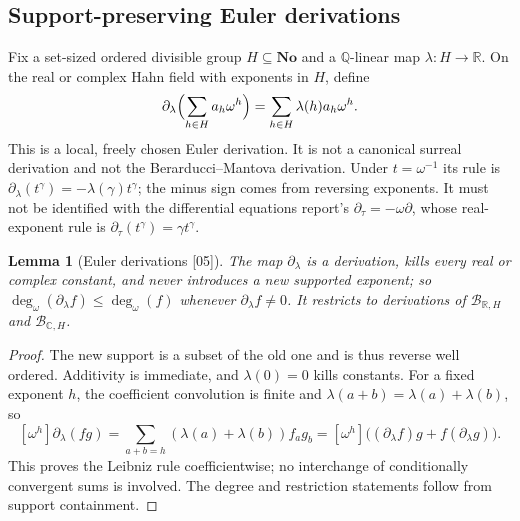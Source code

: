 \documentclass[11pt,oneside]{article}
\numberwithin{equation}{section}
\newtheorem{lemma}[lemma]{Lemma}
\theoremstyle{definition}
\theoremstyle{remark}
\newcommand{\No}{\mathbf{No}}
\newcommand{\Q}{\mathbb Q}
\newcommand{\R}{\mathbb R}
\newcommand{\C}{\mathbb C}
\newcommand{\ddeg}{\operatorname{deg}_{\omega}}
\newcommand{\src}[1]{\textup{\textsf{\small[#1]}}}
\newcommand{\replabel}[1]{\nolinkurl{#1}}
\begin{document}
\subsection{Support-preserving Euler derivations}

Fix a set-sized ordered divisible group $H\subseteq\No$ and a $\Q$-linear
map $\lambda:H\to\R$. On the real or complex Hahn field with exponents in
$H$, define
\begin{equation}\label{odg:eq:euler}
 \partial_\lambda\Bigl(\sum_{h\in H}a_h\omega^h\Bigr)
   =\sum_{h\in H}\lambda(h)a_h\omega^h.
\end{equation}
This is a local, freely chosen Euler derivation. It is not a canonical
surreal derivation and not the Berarducci--Mantova derivation. Under
$t=\omega^{-1}$ its rule is
$\partial_\lambda(t^\gamma)=-\lambda(\gamma)t^\gamma$; the minus sign comes
from reversing exponents. It must not be identified with the differential
equations report's $\partial_\tau=-\omega\partial$, whose real-exponent rule
is $\partial_\tau(t^\gamma)=\gamma t^\gamma$.

\begin{lemma}[Euler derivations \src{05}]\label{odg:lem:derivation}
The map $\partial_\lambda$ is a derivation, kills every real or complex
constant, and never introduces a new supported exponent; so
$\ddeg(\partial_\lambda f)\le\ddeg(f)$ whenever $\partial_\lambda f\ne0$.
It restricts to derivations of $\mathcal B_{\R,H}$ and $\mathcal B_{\C,H}$.
\end{lemma}
\begin{proof}
The new support is a subset of the old one and is thus reverse well
ordered. Additivity is immediate, and $\lambda(0)=0$ kills constants. For a
fixed exponent $h$, the coefficient convolution is finite and
$\lambda(a+b)=\lambda(a)+\lambda(b)$, so
\[
 [\omega^h]\partial_\lambda(fg)
 =\sum_{a+b=h}(\lambda(a)+\lambda(b))f_a g_b
 =[\omega^h]\bigl((\partial_\lambda f)g+f(\partial_\lambda g)\bigr).
\]
This proves the Leibniz rule coefficientwise; no interchange of conditionally
convergent sums is involved. The degree and restriction statements follow
from support containment.
\end{proof}

\noindent[Added 1 October 2026, batch 73: the real-vector-space-structure
report proves the converse for diagonal derivations on the whole class (its
Theorem~18.5, \replabel{rvs:thm:diagonal-derivation}). For every additive
$d:(\No,+)\to(\R,+)$ the map $D_d$ sending
$\sum_\gamma r_\gamma\omega^\gamma$ to
$\sum_\gamma r_\gamma d(\gamma)\omega^\gamma$ is a strong $\R$-linear
derivation of $\No$, and every strong $\R$-linear derivation $D$ of $\No$
with $D(\omega^\gamma)\in\R\omega^\gamma$ for every $\gamma$ is $D_d$ for a
unique additive $d$. On the real Hahn field with exponents in $H$,
\eqref{odg:eq:euler} is the same formula with $d=\lambda$; that report cites
\cref{odg:lem:derivation,odg:cr:lem:euler} for the forward direction. No
result here uses the converse.]
\end{document}
